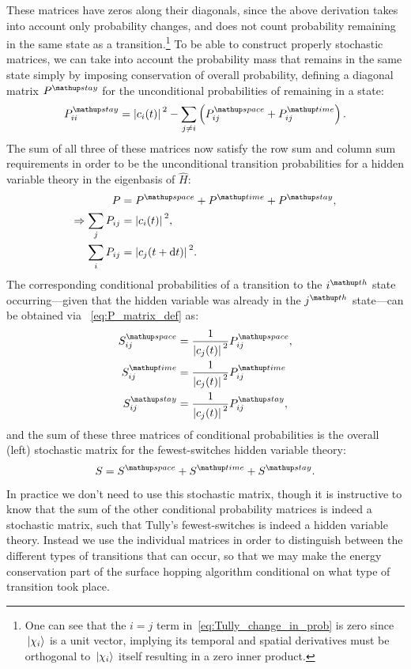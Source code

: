 These matrices have zeros along their diagonals, since the above derivation takes into account only probability changes, and does not count probability remaining in the same state as a transition.\footnote{One can see that the $i=j$ term in~\eqref{eq:Tully_change_in_prob} is zero since $\ket{\chi_i}$ is a unit vector, implying its temporal and spatial derivatives must be orthogonal to $\ket{\chi_i}$ itself resulting in a zero inner product.} To be able to construct properly stochastic matrices, we can take into account the probability mass that remains in the same state simply by imposing conservation of overall probability, defining a diagonal matrix $P^\up{stay}$ for the unconditional probabilities of remaining in a state:
\begin{align}
P^\up{stay}_{ii} = \abs{c_i(t)}^2
- \sum_{j\neq i} \left(P^\up{space}_{ij} + P^\up{time}_{ij}\right).
\end{align}
The sum of all three of these matrices now satisfy the row sum and column sum requirements in order to be the unconditional transition probabilities for a hidden variable theory in the eigenbasis of $\hat H$:
\begin{align}
P &= P^\up{space} + P^\up{time} + P^\up{stay},\\
\Rightarrow \sum_j P_{ij} &= \abs{c_i(t)}^2,\\
\sum_i P_{ij} &= \abs{c_j(t + \dd t)}^2.
\end{align}
The corresponding conditional probabilities of a transition to the $i^\up{th}$ state occurring---given that the hidden variable was already in the $j^\up{th}$ state---can be obtained via ~\eqref{eq:P_matrix_def} as:
\begin{align}
S^\up{space}_{ij} &= \frac1{\abs{c_j(t)}^2} P^\up{space}_{ij},\\
S^\up{time}_{ij} &= \frac1{\abs{c_j(t)}^2} P^\up{time}_{ij}\\
S^\up{stay}_{ij} &= \frac1{\abs{c_j(t)}^2} P^\up{stay}_{ij},
\end{align}
and the sum of these three matrices of conditional probabilities is the overall (left) stochastic matrix for the fewest-switches hidden variable theory:
\begin{align}
S = S^\up{space} + S^\up{time} + S^\up{stay}.
\end{align}
In practice we don't need to use this stochastic matrix, though it is instructive to know that the sum of the other conditional probability matrices is indeed a stochastic matrix, such that Tully's fewest-switches is indeed a hidden variable theory.
Instead we use the individual matrices in order to distinguish between the different types of transitions that can occur, so that we may make the energy conservation part of the surface hopping algorithm conditional on what type of transition took place.

